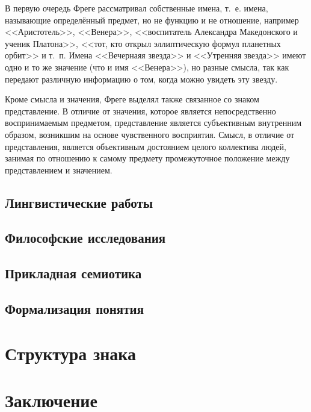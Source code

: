 \documentclass[a4paper,12pt]{article}
\begin{document}
	В первую очередь Фреге рассматривал собственные имена, т.~е. имена, называющие определённый предмет, но не функцию и не отношение, например <<Аристотель>>, <<Венера>>, <<воспитатель Александра Македонского и ученик Платона>>, <<тот, кто открыл эллиптическую формул планетных орбит>> и т.~п. Имена <<Вечернаяя звезда>> и <<Утренняя звезда>> имеют одно и то же значение (что и имя <<Венера>>), но разные смысла, так как передают различную информацию о том, когда можно увидеть эту звезду.
	
	Кроме смысла и значения, Фреге выделял также связанное со знаком представление. В отличие от значения, которое является непосредственно воспринимаемым предметом, представление является субъективным внутренним образом, возникшим на основе чувственного восприятия. Смысл, в отличие от представления, является объективным достоянием целого коллектива людей, занимая по отношению к самому предмету промежуточное положение между представлением и значением.
	\subsection{Лингвистические работы}
	
	\subsection{Философские исследования}
	
	\subsection{Прикладная семиотика}
	
	\subsection{Формализация понятия}
	
	\section{Структура знака}
	\section*{Заключение}
	
   \printbibliography
\end{document}
